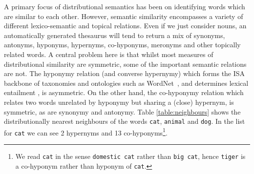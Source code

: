 \documentclass[11pt]{article}
\begin{document}
A primary focus of distributional semantics has been on identifying words which are similar to each other. However, semantic similarity encompasses a variety of different lexico-semantic and topical relations.  Even if we just consider nouns, an automatically generated thesaurus will tend to return a mix of synonyms, antonyms, hyponyms, hypernyms, co-hyponyms, meronyms and other topically related words.  A central problem here is that whilst most measures of distributional similarity are symmetric, some of the important semantic relations are not.  The hyponymy relation (and converse hypernymy) which forms the ISA backbone of taxonomies and ontologies such as WordNet~\cite{Fellbaum:98}, and determines lexical entailment \cite{Geffet2005}, is asymmetric. On the other hand, the co-hyponymy relation which relates two words unrelated by hyponymy but sharing a (close) hypernym, is symmetric, as are synonymy and antonymy. Table \ref{table:neighbours} shows the distributionally nearest neighbours of the words \texttt{cat}, \texttt{animal} and \texttt{dog}. %
In the list for \texttt{cat} we can see 2 hypernyms and 13 co-hyponyms\footnote{We read \texttt{cat} in the sense \texttt{domestic cat} rather than \texttt{big cat}, hence \texttt{tiger} is a co-hyponym rather than hyponym of \texttt{cat}.}. 

\end{document}

